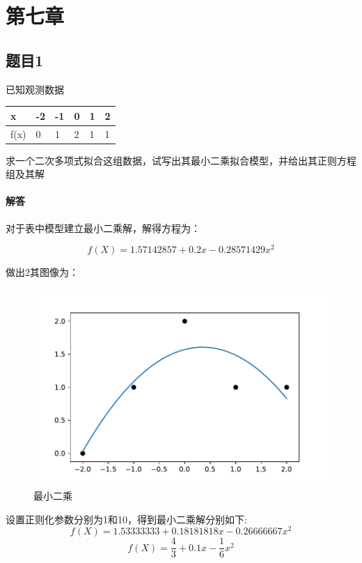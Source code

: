 \section{第七章}

\subsection{题目1}

已知观测数据
\begin{table}[H]
\centering
\begin{tabular}{llllll}\hline
x    & -2 & -1 & 0 & 1 & 2 \\ \hline
f(x) & 0  & 1  & 2 & 1 & 1\\ \hline
\end{tabular}
\end{table}
求一个二次多项式拟合这组数据，试写出其最小二乘拟合模型，并给出其正则方程组及其解

 



\paragraph{解答}

对于表中模型建立最小二乘解，解得方程为：

$$f(X)=1.57142857+0.2x-0.28571429x^2$$

做出2其图像为：

\begin{figure}[H]
	\centering
	\caption{最小二乘}
	\includegraphics[width=\linewidth]{7-1.pdf}
\end{figure}

设置正则化参数分别为1和10，得到最小二乘解分别如下:
$$f(X)=1.53333333+0.18181818x-0.26666667x^2$$
$$f(X)=\frac{4}{3}+0.1x-\frac{1}{6}x^2$$

